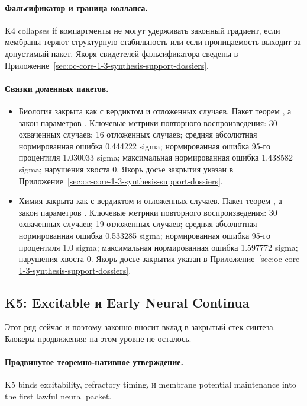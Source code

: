 \paragraph{Фальсификатор и граница коллапса.}
K4 collapses if компартменты не могут удерживать законный градиент, если мембраны теряют структурную стабильность или если проницаемость выходит за допустимый пакет.
Якоря свидетелей фальсификатора сведены в Приложение~\ref{sec:oc-core-1-3-synthesis-support-dossiers}.

\paragraph{Связки доменных пакетов.}
\begin{itemize}[leftmargin=1.6em,nosep]
\item Биология закрыта как  с вердиктом  и  отложенных случаев. Пакет теорем , а закон параметров . Ключевые метрики повторного воспроизведения: 30 охваченных случаев; 16 отложенных случаев; средняя абсолютная нормированная ошибка 0.444222 sigma; нормированная ошибка 95-го процентиля 1.030033 sigma; максимальная нормированная ошибка 1.438582 sigma; нарушения хвоста 0. Якорь досье закрытия указан в Приложение~\ref{sec:oc-core-1-3-synthesis-support-dossiers}.
\item Химия закрыта как  с вердиктом  и  отложенных случаев. Пакет теорем , а закон параметров . Ключевые метрики повторного воспроизведения: 30 охваченных случаев; 19 отложенных случаев; средняя абсолютная нормированная ошибка 0.533285 sigma; нормированная ошибка 95-го процентиля 1.0 sigma; максимальная нормированная ошибка 1.597772 sigma; нарушения хвоста 0. Якорь досье закрытия указан в Приложение~\ref{sec:oc-core-1-3-synthesis-support-dossiers}.
\end{itemize}

\subsection{K5: Excitable и Early Neural Continua}
\label{sec:oc-core-1-3-synthesis-k5}
Этот ряд сейчас  и поэтому законно вносит вклад в закрытый стек синтеза.
Блокеры продвижения: на этом уровне не осталось.

\paragraph{Продвинутое теоремно-нативное утверждение.}
K5 binds excitability, refractory timing, и membrane potential maintenance into the first lawful neural packet.

